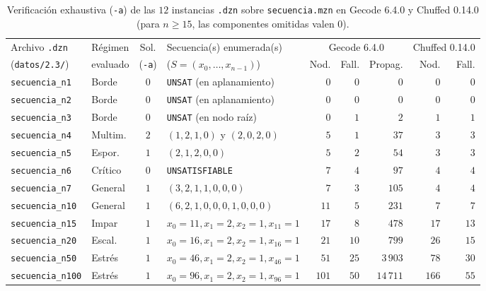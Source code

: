 \begin{table}[htbp]
    \centering
    \footnotesize
    \setlength{\tabcolsep}{3.6pt}
    \begin{tabular}{llclrrrrr}
        \toprule
        Archivo \texttt{.dzn} & Régimen & Sol. & Secuencia(s) enumerada(s) & \multicolumn{3}{c}{Gecode 6.4.0} & \multicolumn{2}{c}{Chuffed 0.14.0} \\
        \cmidrule(lr){5-7} \cmidrule(lr){8-9}
        (\texttt{datos/2.3/}) & evaluado & (\texttt{-a}) & ($S = (x_0, \dots, x_{n-1})$) & Nod. & Fall. & Propag. & Nod. & Fall. \\
        \midrule
        \texttt{secuencia\_n1}   & Borde   & $0$ & \texttt{UNSAT} (en aplanamiento)    & $0$   & $0$  & $0$       & $0$   & $0$  \\
        \texttt{secuencia\_n2}   & Borde   & $0$ & \texttt{UNSAT} (en aplanamiento)    & $0$   & $0$  & $0$       & $0$   & $0$  \\
        \texttt{secuencia\_n3}   & Borde   & $0$ & \texttt{UNSAT} (en nodo raíz)       & $0$   & $1$  & $2$       & $1$   & $1$  \\
        \texttt{secuencia\_n4}   & Multim. & $2$ & $(1,2,1,0)$ y $(2,0,2,0)$           & $5$   & $1$  & $37$      & $3$   & $3$  \\
        \texttt{secuencia\_n5}   & Espor.  & $1$ & $(2,1,2,0,0)$                       & $5$   & $2$  & $54$      & $3$   & $3$  \\
        \texttt{secuencia\_n6}   & Crítico & $0$ & \texttt{UNSATISFIABLE}              & $7$   & $4$  & $97$      & $4$   & $4$  \\
        \texttt{secuencia\_n7}   & General & $1$ & $(3,2,1,1,0,0,0)$                   & $7$   & $3$  & $105$     & $4$   & $4$  \\
        \texttt{secuencia\_n10}  & General & $1$ & $(6,2,1,0,0,0,1,0,0,0)$             & $11$  & $5$  & $231$     & $7$   & $7$  \\
        \texttt{secuencia\_n15}  & Impar   & $1$ & $x_0=11, x_1=2, x_2=1, x_{11}=1$    & $17$  & $8$  & $478$     & $17$  & $13$ \\
        \texttt{secuencia\_n20}  & Escal.  & $1$ & $x_0=16, x_1=2, x_2=1, x_{16}=1$    & $21$  & $10$ & $799$     & $26$  & $15$ \\
        \texttt{secuencia\_n50}  & Estrés  & $1$ & $x_0=46, x_1=2, x_2=1, x_{46}=1$    & $51$  & $25$ & $3\,903$  & $78$  & $30$ \\
        \texttt{secuencia\_n100} & Estrés  & $1$ & $x_0=96, x_1=2, x_2=1, x_{96}=1$    & $101$ & $50$ & $14\,711$ & $166$ & $55$ \\
        \bottomrule
    \end{tabular}
    \caption{Verificación exhaustiva (\texttt{-a}) de las $12$ instancias \texttt{.dzn} sobre \texttt{secuencia.mzn} en Gecode 6.4.0 y Chuffed 0.14.0 (para $n \ge 15$, las componentes omitidas valen $0$).}
    \label{tab:secuencia_bateria_dzn}
\end{table}

